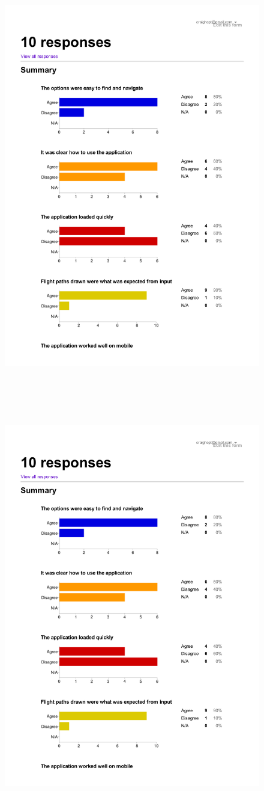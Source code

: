 \begin{figure}[h!]
    \includegraphics[width=15cm,height=18cm,page=2]{images/questionnaireResults.pdf}
\end{figure}

\begin{figure}[h!]
    \includegraphics[width=15cm,height=18cm,page=3]{images/questionnaireResults.pdf}
\end{figure}